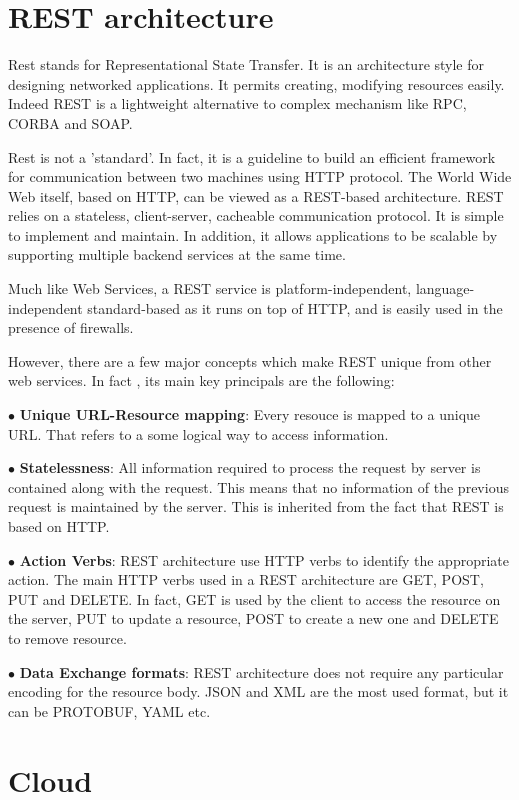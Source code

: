 \section{REST architecture}
Rest stands for Representational State Transfer. It is an architecture style for
designing networked applications. It permits creating, modifying resources
easily. Indeed REST is a lightweight alternative to complex mechanism like RPC,
CORBA and SOAP.

Rest is not a 'standard'. In fact,  it is a guideline to build an efficient
framework for communication between two machines using HTTP protocol. The World
Wide Web itself, based on HTTP, can be viewed as a REST-based architecture. REST
relies on a stateless, client-server, cacheable communication protocol. It is
simple to implement and maintain. In addition, it allows applications to be scalable
by supporting multiple backend services at the same time.

Much like Web Services, a REST service is platform-independent,
language-independent standard-based as it runs on top of HTTP, and is easily used
in the presence of firewalls.

However, there are a few major concepts which make REST unique from other web
services. In fact , its main key principals are the following:

$\bullet$ \textbf{Unique URL-Resource mapping}: Every resouce is mapped to a unique URL. That
refers to a some logical way  to access information. 

$\bullet$ \textbf{Statelessness}: All information required to process the request by server is
contained along with the request. This means that no information of the previous
request is maintained by the server. This is inherited from the fact that REST
is based on HTTP.

$\bullet$ \textbf{Action Verbs}: REST architecture use HTTP verbs to identify the appropriate
action. The main HTTP verbs used in a REST architecture are GET, POST, PUT and
DELETE. In fact, GET is used by the client to access the resource on the server,
PUT to update a resource, POST to create a new one and DELETE to remove
resource.

$\bullet$ \textbf{Data Exchange formats}: REST architecture does not require any particular
encoding for the resource body. JSON and XML are the most used format, but it
can be PROTOBUF, YAML etc. 

\section{Cloud}

